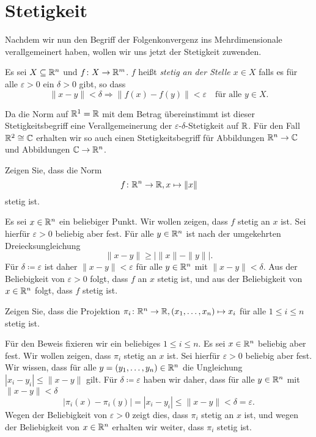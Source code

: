 \documentclass[a4paper,10pt]{article}
\begin{document}
\section{Stetigkeit}


Nachdem wir nun den Begriff der Folgenkonvergenz ins Mehrdimensionale verallgemeinert haben, wollen wir uns jetzt der Stetigkeit zuwenden.


\begin{defi}
 Es sei $X \subseteq \mathbb{R}^n$ und $f \colon X \to \mathbb{R}^m$. $f$ heißt \emph{stetig an der Stelle $x \in X$} falls es für alle $\varepsilon > 0$ ein $\delta > 0$ gibt, so dass
 \[
  \|x-y\| < \delta \Rightarrow \|f(x)-f(y)\| < \varepsilon \quad \text{für alle $y \in X$}.
 \]
\end{defi}




Da die Norm auf $\mathbb{R}^1 = \mathbb{R}$ mit dem Betrag übereinstimmt ist dieser Stetigkeitsbegriff eine Verallgemeinerung der $\varepsilon$-$\delta$-Stetigkeit auf $\mathbb{R}$. Für den Fall $\mathbb{R}^2 \cong \mathbb{C}$ erhalten wir so auch einen Stetigkeitsbegriff für Abbildungen $\mathbb{R}^n \to \mathbb{C}$ und Abbildungen $\mathbb{C} \to \mathbb{R}^n$.


\begin{question}
 Zeigen Sie, dass die Norm
 \[
  f \colon \mathbb{R}^n \to \mathbb{R}, x \mapsto \|x\|
 \]
 stetig ist.
\end{question}
\begin{solution}
 Es sei $x \in \mathbb{R}^n$ ein beliebiger Punkt. Wir wollen zeigen, dass $f$ stetig an $x$ ist. Sei hierfür $\varepsilon > 0$ beliebig aber fest. Für alle $y \in \mathbb{R}^n$ ist nach der umgekehrten Dreiecksungleichung
 \[
  \|x-y\| \geq |\|x\|-\|y\||.
 \]
 Für $\delta \coloneqq \varepsilon$ ist daher $\|x-y\| < \varepsilon$ für alle $y \in \mathbb{R}^n$ mit $\|x-y\| < \delta$. Aus der Beliebigkeit von $\varepsilon > 0$ folgt, dass $f$ an $x$ stetig ist, und aus der Beliebigkeit von $x \in \mathbb{R}^n$ folgt, dass $f$ stetig ist.
\end{solution}


\begin{question}
 Zeigen Sie, dass die Projektion $\pi_i \colon \mathbb{R}^n \to \mathbb{R}, (x_1, \dotsc, x_n) \mapsto x_i$ für alle $1 \leq i \leq n$ stetig ist.
\end{question}
\begin{solution}
 Für den Beweis fixieren wir ein beliebiges $1 \leq i \leq n$. Es sei $x \in \mathbb{R}^n$ beliebig aber fest. Wir wollen zeigen, dass $\pi_i$ stetig an $x$ ist. Sei hierfür $\varepsilon > 0$ beliebig aber fest. Wir wissen, dass für alle $y = (y_1, \dotsc, y_n) \in \mathbb{R}^n$ die Ungleichung $|x_i - y_i| \leq \|x-y\|$ gilt. Für $\delta \coloneqq \varepsilon$ haben wir daher, dass für alle $y \in \mathbb{R}^n$ mit $\|x-y\| < \delta$
 \[
  |\pi_i(x)-\pi_i(y)| = |x_i - y_i| \leq \|x-y\| < \delta = \varepsilon.
 \]
 Wegen der Beliebigkeit von $\varepsilon > 0$ zeigt dies, dass $\pi_i$ stetig an $x$ ist, und wegen der Beliebigkeit von $x \in \mathbb{R}^n$ erhalten wir weiter, dass $\pi_i$ stetig ist.
\end{solution}
\end{document}
